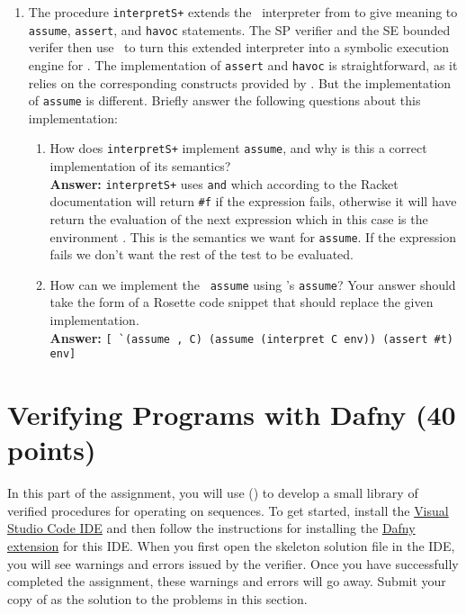 \documentclass{handout}
\begin{document}
\begin{questions}
\begin{enumerate}
\item The procedure \lstinline{interpretS+} extends the \imp\ interpreter from
  to give meaning to \lstinline{assume}, \lstinline{assert},
 and \lstinline{havoc} statements. The SP verifier and the SE bounded verifer
 then use \rosette\ to turn this extended interpreter into a symbolic execution
 engine for \ivl. The implementation of \lstinline{assert} and \lstinline{havoc}
 is straightforward, as it relies on the corresponding constructs provided by
 \rosette. But the implementation of \lstinline{assume} is different.
 Briefly answer the following questions about this implementation:
 \begin{enumerate}
  \item How does \lstinline{interpretS+} implement \lstinline{assume}, and why
  is this a correct implementation of its semantics?\\
  
 \textbf{Answer:} \lstinline{interpretS+} uses \lstinline{and} which according to the Racket documentation will return \lstinline{#f} if the expression fails, otherwise it will have return the evaluation of the next expression which in this case is the environment . This is the semantics we want for \lstinline{assume}. If the expression fails we don't want the rest of the  test to be evaluated. \\

 
  \item How can we implement the \imp\ \lstinline{assume} using \rosette's
  \lstinline{assume}?  Your answer should take the form of a Rosette code
  snippet that should replace the given implementation.\\
  
 \textbf{Answer:} \lstinline{[ `(assume , C) (assume (interpret C env)) (assert #t) env]}

 
 \end{enumerate}

 \end{enumerate}




\end{questions}

\section{Verifying Programs with Dafny (40 points)}

In this part of the assignment, you will use \dafny () to develop a
small library of verified procedures for operating on sequences. To get started,
install the \href{https://code.visualstudio.com}{Visual Studio Code IDE} and
then follow the instructions for installing the
\href{https://github.com/dafny-lang/dafny/wiki/INSTALL#visual-studio-code}{Dafny
extension} for this IDE. When you first open the skeleton solution file
 in the IDE, you will see warnings and errors issued by
the verifier. Once you have successfully completed the assignment, these
warnings and errors will go away. Submit your copy of  as
the solution to the problems in this section.
\end{document}
